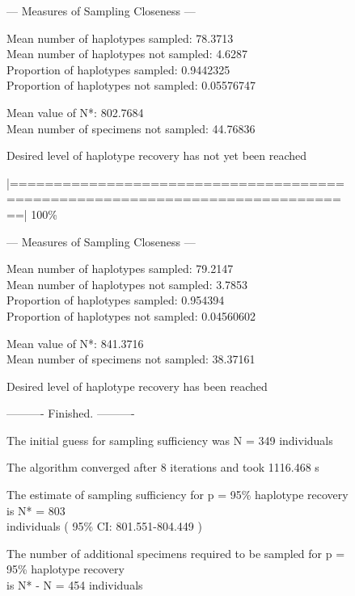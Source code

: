 \begin{figure}[H]
{\noindent --- Measures of Sampling Closeness ---

\vspace{2mm} 
 
\noindent Mean number of haplotypes sampled: 78.3713 \\
Mean number of haplotypes not sampled: 4.6287  \\
Proportion of haplotypes sampled: 0.9442325  \\
Proportion of haplotypes not sampled: 0.05576747     

\vspace{2mm} 
 
\noindent Mean value of N*: 802.7684  \\
Mean number of specimens not sampled: 44.76836

\vspace{3mm}
 
\noindent Desired level of haplotype recovery has not yet been reached

\vspace{2mm}

\noindent |==============================================================================| 100\%

\vspace{3mm}

\noindent --- Measures of Sampling Closeness ---

\vspace{2mm} 
 
\noindent Mean number of haplotypes sampled: 79.2147  \\
Mean number of haplotypes not sampled: 3.7853 \\
Proportion of haplotypes sampled: 0.954394 \\
Proportion of haplotypes not sampled: 0.04560602  

\vspace{2mm} 
 
\noindent Mean value of N*: 841.3716 \\
Mean number of specimens not sampled: 38.37161 

\vspace{3mm}
 
\noindent Desired level of haplotype recovery has been reached

\vspace{2mm}

\noindent ---------- Finished. ----------
        
\noindent The initial guess for sampling sufficiency was N = 349 individuals
 
\noindent The algorithm converged after 8 iterations and took 1116.468 s 
 
\noindent The estimate of sampling sufficiency for p = 95\% haplotype recovery is N* = 803 \\ individuals ( 95\% CI: 801.551-804.449 )

\noindent The number of additional specimens required to be sampled for p = 95\% haplotype recovery \\ is N* - N = 454 individuals

}

\end{figure}


